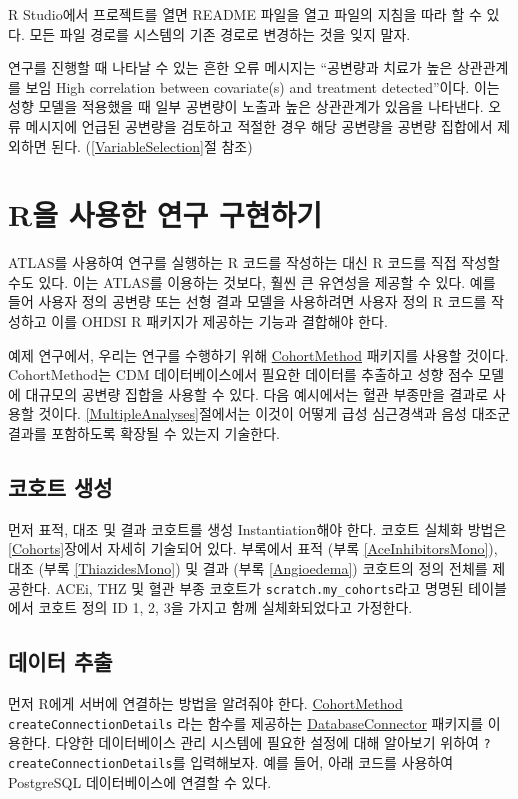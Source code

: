 \documentclass[10.5pt]{book}
\theoremstyle{definition}
\theoremstyle{definition}
\theoremstyle{definition}
\theoremstyle{remark}
\begin{document}
R Studio에서 프로젝트를 열면 README 파일을 열고 파일의 지침을 따라 할 수
있다. 모든 파일 경로를 시스템의 기존 경로로 변경하는 것을 잊지 말자.

연구를 진행할 때 나타날 수 있는 흔한 오류 메시지는 ``공변량과 치료가
높은 상관관계를 보임 High correlation between covariate(s) and treatment
detected''이다. 이는 성향 모델을 적용했을 때 일부 공변량이 노출과 높은
상관관계가 있음을 나타낸다. 오류 메시지에 언급된 공변량을 검토하고
적절한 경우 해당 공변량을 공변량 집합에서 제외하면 된다.
(\ref{VariableSelection}절 참조) 

\section{R을 사용한 연구 구현하기}\label{pleR}

ATLAS를 사용하여 연구를 실행하는 R 코드를 작성하는 대신 R 코드를 직접
작성할 수도 있다. 이는 ATLAS를 이용하는 것보다, 훨씬 큰 유연성을 제공할
수 있다. 예를 들어 사용자 정의 공변량 또는 선형 결과 모델을 사용하려면
사용자 정의 R 코드를 작성하고 이를 OHDSI R 패키지가 제공하는 기능과
결합해야 한다.

예제 연구에서, 우리는 연구를 수행하기 위해
\href{https://ohdsi.github.io/CohortMethod/}{CohortMethod} 패키지를
사용할 것이다. CohortMethod는 CDM 데이터베이스에서 필요한 데이터를
추출하고 성향 점수 모델에 대규모의 공변량 집합을 사용할 수 있다. 다음
예시에서는 혈관 부종만을 결과로 사용할 것이다.
\ref{MultipleAnalyses}절에서는 이것이 어떻게 급성 심근경색과 음성 대조군
결과를 포함하도록 확장될 수 있는지 기술한다.

\subsection{코호트 생성}\label{-}

먼저 표적, 대조 및 결과 코호트를 생성 Instantiation해야 한다. 코호트
실체화 방법은 \ref{Cohorts}장에서 자세히 기술되어 있다. 부록에서 표적
(부록 \ref{AceInhibitorsMono}), 대조 (부록 \ref{ThiazidesMono}) 및 결과
(부록 \ref{Angioedema}) 코호트의 정의 전체를 제공한다. ACEi, THZ 및 혈관
부종 코호트가 \texttt{scratch.my\_cohorts}라고 명명된 테이블에서 코호트
정의 ID 1, 2, 3을 가지고 함께 실체화되었다고 가정한다.

\subsection{데이터 추출}\label{-}

먼저 R에게 서버에 연결하는 방법을 알려줘야 한다.
\href{https://ohdsi.github.io/CohortMethod/}{CohortMethod}
\texttt{createConnectionDetails} 라는 함수를 제공하는
\href{https://ohdsi.github.io/DatabaseConnector/}{DatabaseConnector}
패키지를 이용한다. 다양한 데이터베이스 관리 시스템에 필요한 설정에 대해
알아보기 위하여 \texttt{?createConnectionDetails}를 입력해보자. 예를
들어, 아래 코드를 사용하여 PostgreSQL 데이터베이스에 연결할 수 있다.
\end{document}
